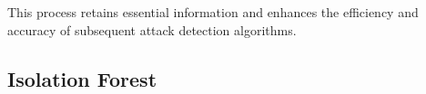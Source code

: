 \documentclass[conference]{IEEEtran}
\begin{document}






This process retains essential information and enhances the efficiency and accuracy of subsequent attack detection algorithms.

\subsection{Isolation Forest}
\label{sec:method_forest}
\end{document}
